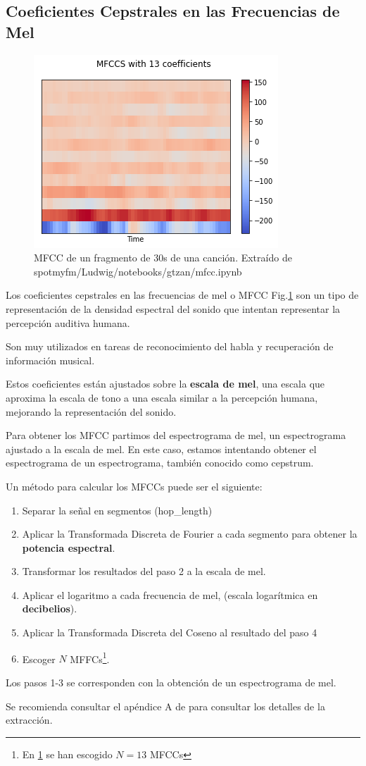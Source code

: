 \subsection{Coeficientes Cepstrales en las Frecuencias de
Mel}\label{coeficientes-cepstrales-en-las-frecuencias-de-mel}


\begin{figure}
    \centering
    \includegraphics{img/3/mfcc.png}
    \caption{MFCC de un fragmento de 30s de una canción. Extraído de spotmyfm/Ludwig/notebooks/gtzan/mfcc.ipynb}
    \label{fig:MFCC}
\end{figure}
Los coeficientes cepstrales en las frecuencias de mel o MFCC Fig.\ref{fig:MFCC} son un tipo
de representación de la densidad espectral del sonido que intentan
representar la percepción auditiva humana.

Son muy utilizados en tareas de reconocimiento del habla y recuperación
de información musical.

Estos coeficientes están ajustados sobre la \textbf{escala de mel}, una
escala que aproxima la escala de tono a una escala similar a la
percepción humana, mejorando la representación del sonido.

Para obtener los MFCC partimos del espectrograma de mel, un
espectrograma ajustado a la escala de mel. En este caso, estamos
intentando obtener el espectrograma de un espectrograma, también conocido como cepstrum.

Un método para calcular los MFCCs puede ser el siguiente:

\begin{enumerate}
\def\labelenumi{\arabic{enumi}.}
\item
  Separar la señal en segmentos (hop\_length)
\item
  Aplicar la Transformada Discreta de Fourier a cada segmento para
  obtener la \textbf{potencia espectral}.
\item
  Transformar los resultados del paso 2 a la escala de mel.
\item
  Aplicar el logaritmo a cada frecuencia de mel, (escala logarítmica en
  \textbf{decibelios}).
\item
  Aplicar la Transformada Discreta del Coseno al resultado del paso 4
\item
  Escoger $N$ MFFCs\footnote{En \ref{fig:MFCC} se han escogido $N=13$ MFCCs}.
\end{enumerate}

Los pasos 1-3 se corresponden con la obtención de un espectrograma de mel.

Se recomienda consultar el apéndice A de \cite{book_mfcc} para consultar los detalles de la extracción. 